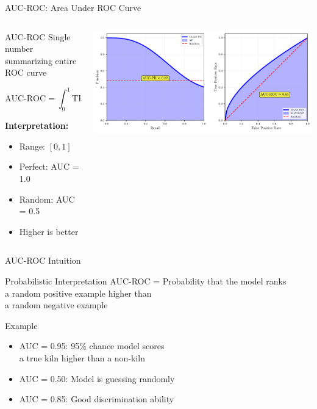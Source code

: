 \documentclass{beamer}
\begin{document}
\begin{frame}{AUC-ROC: Area Under ROC Curve}
\begin{columns}
\begin{column}{0.52\textwidth}
\begin{definitionbox}{AUC-ROC}
\small
Single number summarizing entire ROC curve

\vspace{0.2cm}
\footnotesize
$$\text{AUC-ROC} = \int_0^1 \text{TPR}(\text{FPR}) \, d(\text{FPR})$$

\vspace{0.2cm}

\textbf{Interpretation:}
\begin{itemize}
    \item Range: $[0, 1]$
    \item Perfect: AUC = 1.0
    \item Random: AUC = 0.5
    \item Higher is better
\end{itemize}
\end{definitionbox}
\end{column}
\begin{column}{0.48\textwidth}
\includegraphics[width=\textwidth]{auc-diagram.pdf}
\end{column}
\end{columns}
\end{frame}

\begin{frame}{AUC-ROC Intuition}
\begin{keypointsbox}{Probabilistic Interpretation}
\small
AUC-ROC = Probability that the model ranks \\
a random positive example higher than \\
a random negative example
\end{keypointsbox}

\vspace{0.15cm}

\begin{examplebox}{Example}
\small
\begin{itemize}
    \item AUC = 0.95: 95\% chance model scores \\
          a true kiln higher than a non-kiln
    \item AUC = 0.50: Model is guessing randomly
    \item AUC = 0.85: Good discrimination ability
\end{itemize}
\end{examplebox}
\end{frame}
\end{document}
